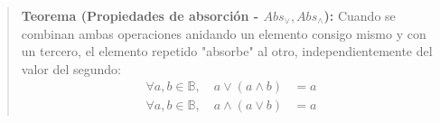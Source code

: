 \begin{quote}\textbf{Teorema (Propiedades de absorción - $Abs_{\vee}, Abs_{\wedge}$):}\label{absorcion}
Cuando se combinan ambas operaciones anidando un elemento consigo mismo y con un tercero, el elemento repetido "absorbe" al otro, independientemente del valor del segundo:
\begin{align*}
    \forall a, b \in \mathbb{B}, \quad a \vee (a \wedge b) &= a \\
    \forall a, b \in \mathbb{B}, \quad a \wedge (a \vee b) &= a
\end{align*}
\end{quote}

